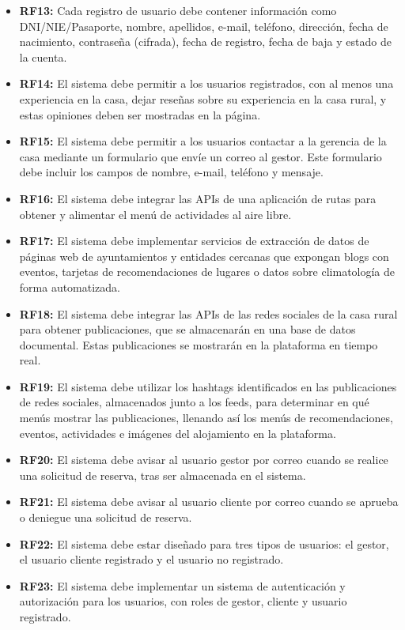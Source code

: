 \begin{itemize}
    \item \textbf{RF13:} Cada registro de usuario debe contener información como DNI/NIE/Pasaporte, nombre, apellidos, e-mail, teléfono, dirección, fecha de nacimiento, contraseña (cifrada), fecha de registro, fecha de baja y estado de la cuenta.
    \item \textbf{RF14:} El sistema debe permitir a los usuarios registrados, con al menos una experiencia en la casa, dejar reseñas sobre su experiencia en la casa rural, y estas opiniones deben ser mostradas en la página.
    \item \textbf{RF15:} El sistema debe permitir a los usuarios contactar a la gerencia de la casa mediante un formulario que envíe un correo al gestor. Este formulario debe incluir los campos de nombre, e-mail, teléfono y mensaje.
    \item \textbf{RF16:} El sistema debe integrar las \glspl{API} de una aplicación de rutas para obtener y alimentar el menú de actividades al aire libre.
    \item \textbf{RF17:} El sistema debe implementar servicios de extracción de datos de páginas web de ayuntamientos y entidades cercanas que expongan blogs con eventos, tarjetas de recomendaciones de lugares o datos sobre climatología de forma automatizada.
    \item \textbf{RF18:} El sistema debe integrar las \glspl{API} de las redes sociales de la casa rural para obtener publicaciones, que se almacenarán en una base de datos documental. Estas publicaciones se mostrarán en la plataforma en tiempo real.
    \item \textbf{RF19:} El sistema debe utilizar los hashtags identificados en las publicaciones de redes sociales, almacenados junto a los feeds, para determinar en qué menús mostrar las publicaciones, llenando así los menús de recomendaciones, eventos, actividades e imágenes del alojamiento en la plataforma.
    \item \textbf{RF20:} El sistema debe avisar al usuario gestor por correo cuando se realice una solicitud de reserva, tras ser almacenada en el sistema.
    \item \textbf{RF21:} El sistema debe avisar al usuario cliente por correo cuando se aprueba o deniegue una solicitud de reserva.
    \item \textbf{RF22:} El sistema debe estar diseñado para tres tipos de usuarios: el gestor, el usuario cliente registrado y el usuario no registrado.
    \item \textbf{RF23:} El sistema debe implementar un sistema de autenticación y autorización para los usuarios, con roles de gestor, cliente y usuario registrado.

\end{itemize}
